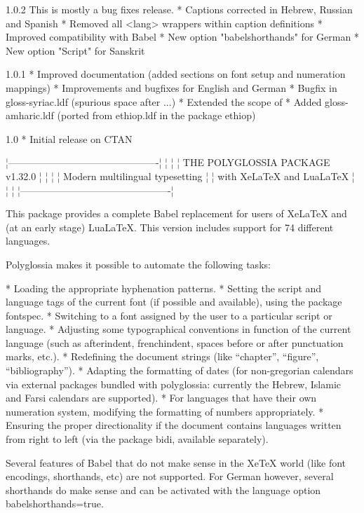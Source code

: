 1.0.2
   This is mostly a bug fixes release.
   * Captions corrected in Hebrew, Russian and Spanish
   * Removed all \text<lang> wrappers within caption definitions
   * Improved compatibility with Babel
   * New option "babelshorthands" for German
   * New option "Script" for Sanskrit

1.0.1
   * Improved documentation (added sections on font setup and numeration mappings)
   * Improvements and bugfixes for English and German
   * Bugfix in gloss-syriac.ldf (spurious space after \textsyriac{...})
   * Extended the scope of \syriacabjad
   * Added gloss-amharic.ldf (ported from ethiop.ldf in the package ethiop)

1.0
   * Initial release on CTAN

   ¦----------------------------------------------¦
   ¦                                              ¦
   ¦       THE POLYGLOSSIA PACKAGE v1.32.0        ¦
   ¦                                              ¦
   ¦     Modern multilingual typesetting          ¦
   ¦        with XeLaTeX and LuaLaTeX             ¦
   ¦                                              ¦
   ¦----------------------------------------------¦

This package provides a complete Babel replacement for users of XeLaTeX and
(at an early stage) LuaLaTeX. This version includes support for 74 different
languages.

Polyglossia makes it possible to automate the following tasks:

* Loading the appropriate hyphenation patterns.
* Setting the script and language tags of the current font (if possible and
  available), using the package fontspec.
* Switching to a font assigned by the user to a particular script or language.
* Adjusting some typographical conventions in function of the current language
  (such as afterindent, frenchindent, spaces before or after punctuation marks,
  etc.).
* Redefining the document strings (like “chapter”, “figure”, “bibliography”).
* Adapting the formatting of dates (for non-gregorian calendars via external
  packages bundled with polyglossia: currently the Hebrew, Islamic and Farsi
  calendars are supported).
* For languages that have their own numeration system, modifying the formatting
  of numbers appropriately.
* Ensuring the proper directionality if the document contains languages
  written from right to left (via the package bidi, available separately).

Several features of Babel that do not make sense in the XeTeX world (like font
encodings, shorthands, etc) are not supported. For German however, several
shorthands do make sense and can be activated with the language option
babelshorthands=true.


